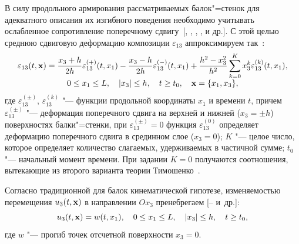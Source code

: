 В силу продольного армирования рассматриваемых балок"=стенок для адекватного
описания их изгибного поведения необходимо учитывать ослабленное
сопротивление поперечному сдвигу~[, , , ,  и др.]. С этой целью
среднюю сдвиговую деформацию композиции $\varepsilon _{13}$ аппроксимируем
так~\cite{yank:bib14}:
\begin{equation}
\label{yank:eq1}
\begin{array}{c}
\displaystyle 
\! \!\! \varepsilon _{13} ( t,{\bf x})= 
 \frac{x_3 +h}{2h}\varepsilon _{13}^{(+)}  ( t,x_1 )-\frac{x_3
-h}{2h}\varepsilon _{13}^{(-)} (t,x_1 )+\frac{h^2-x_3^2 }{h^2}\sum\limits_{k=0}^K x_3^k \varepsilon _{13}^{(k)}  ( t,x_1 ), \! \!\! \\
0 \le x_1 \le L,\quad | x_3 | \le h,\quad t \geq t_0, \quad {\bf x}= \{x_1,x_3 \},
\end{array}
\end{equation}
где $\varepsilon _{13}^{(\pm )}$, $\varepsilon _{13}^{(k)}$ "--- функции
продольной координаты $x_1$ и времени $t$, 
причем $\varepsilon _{13}^{(\pm )}$ "--- деформация
поперечного сдвига на верхней и нижней ($x_3 =\pm h$) поверхностях
балки"=стенки, при $\varepsilon _{13}^{(\pm )} =0$ функция $\varepsilon
_{13}^{(0)}$ определяет деформацию поперечного сдвига в срединном слое
($x_3 =0$); $K$  "---  целое число, которое определяет количество слагаемых,
удерживаемых в частичной сумме; $t_0$  "---  начальный момент времени. При
задании $K=0$ получаются соотношения, вытекающие из второго варианта теории
Тимошенко~\cite{yank:bib13,yank:bib16}.

Согласно традиционной для балок кинематической гипотезе, изменяемостью
перемещения $u_3 (t,{\rm {\bf x}})$ в направлении $Ox_3$
пренебрегаем [-- и~др.]:
\begin{equation}
\label{yank:eq2}
u_3 ( t,{\bf x})=w (t,x_1 ),\quad 0\le x_1 \le L,\quad |x_3 |\le h,\quad t\ge t_0,
\end{equation}
где $w$  "---  прогиб точек отсчетной поверхности $x_3 =0$.

